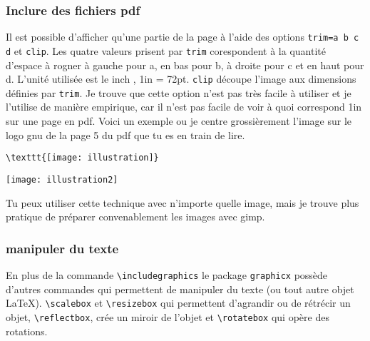 \documentclass[10pt,hyperref={pdfpagemode=FullScreen},xcolor=dvipsnames,xcolor=table, xcolor=svgnames]{beamer}%
\newcommand{\latex}{\LaTeX\xspace}
\begin{document}
 \begin{frame}[fragile]
   \frametitle{Inclure des fichiers pdf}
Il est possible d'afficher qu'une partie de la page à l'aide des options {\color{blue}\verb!trim=a b c d!} et {\color{blue}\verb!clip!}. Les quatre valeurs prisent par {\color{blue}\verb!trim!} corespondent à la quantité d'espace à rogner à gauche pour a, en bas pour b, à droite pour c et en haut pour d. L'unité utilisée est le \og inch \fg, 1in = 72pt. {\color{blue}\verb!clip!} découpe l'image aux dimensions définies par {\color{blue}\verb!trim!}. Je trouve que cette option n'est pas très facile à utiliser et je l'utilise de manière empirique, car il n'est pas facile de voir à quoi correspond 1in sur une page en pdf. Voici un exemple ou je centre grossièrement l'image sur le logo gnu de la page 5 du pdf que tu es en train de lire. 
\begin{exampleblock}{}\footnotesize
\begin{verbatim}
\texttt{[image: illustration]}
\end{verbatim}
\end{exampleblock}
\begin{center}
\texttt{[image: illustration2]}
\end{center}
Tu peux utiliser cette technique avec n'importe quelle image, mais je trouve plus pratique de préparer convenablement les images avec gimp. 
\end{frame}
 \begin{frame}[fragile]
   \frametitle{manipuler du texte}
En plus de la commande {\color{blue}\verb!\includegraphics!} le package {\color{blue}\verb!graphicx!} possède d'autres commandes qui permettent de manipuler du texte (ou tout autre objet \latex). {\color{blue}\verb!\scalebox!} et {\color{blue}\verb!\resizebox!} qui permettent d'agrandir ou de rétrécir un objet, {\color{blue}\verb!\reflectbox!}, crée un miroir de l'objet et {\color{blue}\verb!\rotatebox!} qui opère des rotations.
\end{frame}
\end{document}
